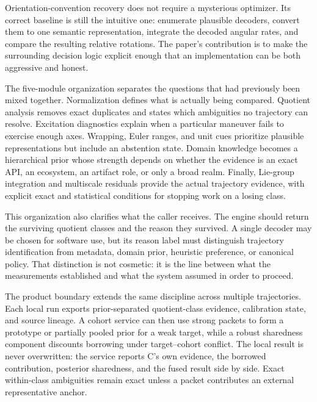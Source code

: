 \documentclass[11pt]{article}
\begin{document}
    Orientation-convention recovery does not require a mysterious optimizer. Its correct
    baseline is still the intuitive one: enumerate plausible decoders, convert them to one
    semantic representation, integrate the decoded angular rates, and compare the resulting
    relative rotations. The paper's contribution is to make the surrounding decision logic
    explicit enough that an implementation can be both aggressive and honest.

    The five-module organization separates the questions that had previously been mixed
    together. Normalization defines what is actually being compared. Quotient analysis
    removes exact duplicates and states which ambiguities no trajectory can resolve.
    Excitation diagnostics explain when a particular maneuver fails to exercise enough axes.
    Wrapping, Euler ranges, and unit cues prioritize plausible representations but include an
    abstention state. Domain knowledge becomes a hierarchical prior whose strength depends
    on whether the evidence is an exact API, an ecosystem, an artifact role, or only a broad
    realm. Finally, Lie-group integration and multiscale residuals provide the actual
    trajectory evidence, with explicit exact and statistical conditions for stopping work on
    a losing class.

    This organization also clarifies what the caller receives. The engine should return the
    surviving quotient classes and the reason they survived. A single decoder may be chosen
    for software use, but its reason label must distinguish trajectory identification from
    metadata, domain prior, heuristic preference, or canonical policy. That distinction is
    not cosmetic: it is the line between what the measurements established and what the
    system assumed in order to proceed.


    The product boundary extends the same discipline across multiple trajectories. Each
    local run exports prior-separated quotient-class evidence, calibration state, and source
    lineage. A cohort service can then use strong packets to form a prototype or partially
    pooled prior for a weak target, while a robust sharedness component discounts borrowing
    under target--cohort conflict. The local result is never overwritten: the service reports
    C's own evidence, the borrowed contribution, posterior sharedness, and the fused result
    side by side. Exact within-class ambiguities remain exact unless a packet contributes an
    external representative anchor.
\end{document}
